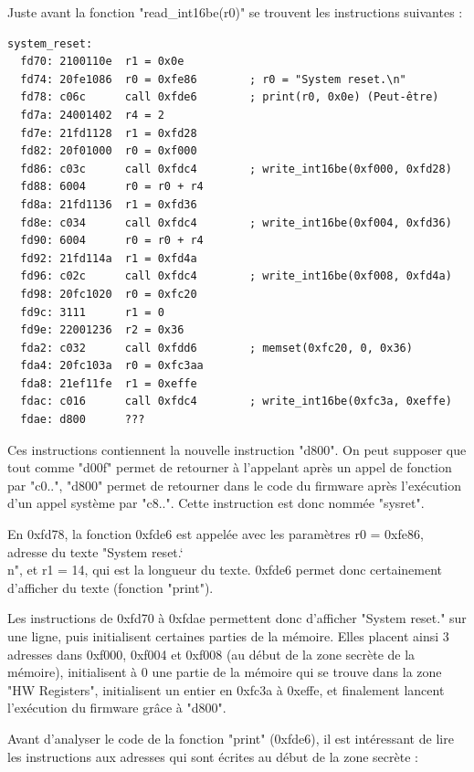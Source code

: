 \documentclass[a4paper,10pt]{article}
\newcommand{\bksl}{\char`\\} %
\begin{document}
Juste avant la fonction "read\_int16be(r0)" se trouvent les instructions suivantes :
\begin{verbatim}
system_reset:
  fd70: 2100110e  r1 = 0x0e
  fd74: 20fe1086  r0 = 0xfe86        ; r0 = "System reset.\n"
  fd78: c06c      call 0xfde6        ; print(r0, 0x0e) (Peut-être)
  fd7a: 24001402  r4 = 2
  fd7e: 21fd1128  r1 = 0xfd28
  fd82: 20f01000  r0 = 0xf000
  fd86: c03c      call 0xfdc4        ; write_int16be(0xf000, 0xfd28)
  fd88: 6004      r0 = r0 + r4
  fd8a: 21fd1136  r1 = 0xfd36
  fd8e: c034      call 0xfdc4        ; write_int16be(0xf004, 0xfd36)
  fd90: 6004      r0 = r0 + r4
  fd92: 21fd114a  r1 = 0xfd4a
  fd96: c02c      call 0xfdc4        ; write_int16be(0xf008, 0xfd4a)
  fd98: 20fc1020  r0 = 0xfc20
  fd9c: 3111      r1 = 0
  fd9e: 22001236  r2 = 0x36
  fda2: c032      call 0xfdd6        ; memset(0xfc20, 0, 0x36)
  fda4: 20fc103a  r0 = 0xfc3aa
  fda8: 21ef11fe  r1 = 0xeffe
  fdac: c016      call 0xfdc4        ; write_int16be(0xfc3a, 0xeffe)
  fdae: d800      ???
\end{verbatim}

Ces instructions contiennent la nouvelle instruction "d800". On peut supposer que tout comme "d00f" permet de retourner à l'appelant après un appel de fonction par "c0..", "d800" permet de retourner dans le code du firmware après l'exécution d'un appel système par "c8..". Cette instruction est donc nommée "sysret".

En 0xfd78, la fonction 0xfde6 est appelée avec les paramètres r0 = 0xfe86, adresse du texte "System reset.\bksl{n}", et r1 = 14, qui est la longueur du texte. 0xfde6 permet donc certainement d'afficher du texte (fonction "print").

Les instructions de 0xfd70 à 0xfdae permettent donc d'afficher "System reset." sur une ligne, puis initialisent certaines parties de la mémoire. Elles placent ainsi 3 adresses dans 0xf000, 0xf004 et 0xf008 (au début de la zone secrète de la mémoire), initialisent à 0 une partie de la mémoire qui se trouve dans la zone "HW Registers", initialisent un entier en 0xfc3a à 0xeffe, et finalement lancent l'exécution du firmware grâce à "d800".

Avant d'analyser le code de la fonction "print" (0xfde6), il est intéressant de lire les instructions aux adresses qui sont écrites au début de la zone secrète :
\end{document}
